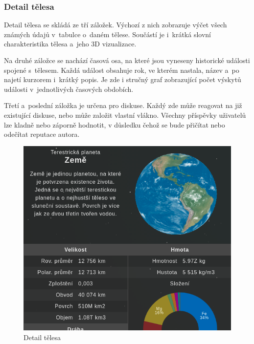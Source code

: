 \documentclass[a4paper,12pt]{article}
\begin{document}
\subsubsection{Detail tělesa}

Detail tělesa se skládá ze tří záložek. Výchozí z nich zobrazuje výčet všech známých údajů v~tabulce o~daném tělese. Součástí je i~krátká slovní charakteristika tělesa a~jeho 3D vizualizace.

Na druhé záložce se nachází časová osa, na které jsou vyneseny historické události spojené s~tělesem. Každá událost obsahuje rok, ve kterém nastala, název a~po najetí kurzorem  i~krátký popis. Je zde i stručný graf zobrazující počet výskytů události v~jednotlivých časových obdobích.

Třetí a~poslední záložka je určena pro diskuse. Každý zde může reagovat na již existující diskuse, nebo může založit vlastní vlákno. Všechny příspěvky uživatelů lze kladně nebo záporně hodnotit, v důsledku čehož se bude přičítat nebo odečítat reputace autora.

\begin{figure}[H]
\begin{center}
\includegraphics[width=350pt]{Images/Body.png}
\caption{Detail tělesa}
\end{center}
\end{figure}
\end{document}
